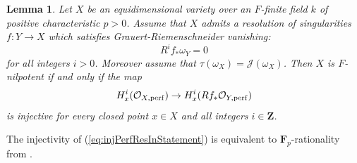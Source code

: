 \documentclass[letterpaper,11pt]{amsart}
\theoremstyle{plain}
\newtheorem{lem}[thm]{Lemma}
\theoremstyle{definition}
\theoremstyle{remark}
\def\Z{{\mathbf Z}}
\def\cJ{\mathcal{J}}
\def\cO{\mathcal{O}}
\begin{document}
\begin{lem} \label{lem:RationalPerfDefofFNilpt}
Let $X$ be an equidimensional  variety over an $F$-finite field $k$ of positive characteristic $p>0$. Assume that $X$ admits a resolution of singularities $f \colon Y \to X$ which satisfies Grauert-Riemenschneider vanishing:
\begin{equation} \label{eq:GRinLemma}
R^if_*\omega_Y = 0
\end{equation}
for all integers $i>0$.  Moreover assume that $\tau(\omega_X) = \cJ(\omega_X)$. Then $X$ is $F$-nilpotent if and only if the map
\begin{equation} \label{eq:injPerfResInStatement}
H^{i}_x(\cO_{X, {\rm perf}}) \to H^{i}_x(Rf_*\cO_{Y, {\rm perf}})
\end{equation}
is injective for every closed point $x \in X$ and all integers $i \in \Z$.
\end{lem}
\noindent The injectivity of (\ref{eq:injPerfResInStatement}) is equivalent to $\mathbf{F}_p$-rationality from \cite{baudin2026frobeniusstableversiongrauertriemenschneidervanishing}.
\end{document}
